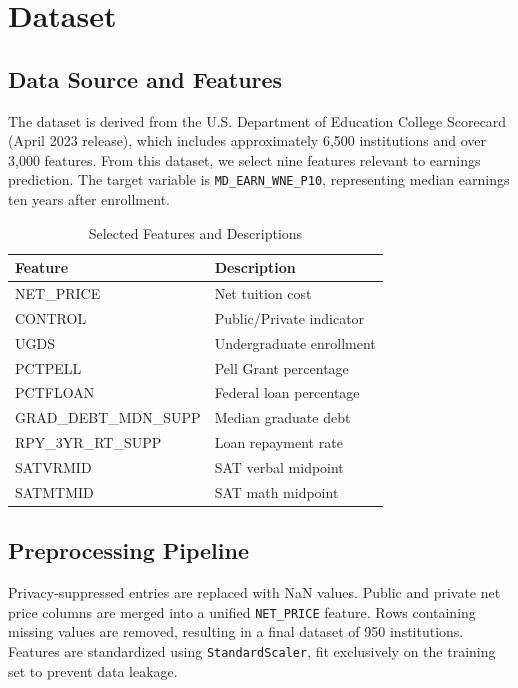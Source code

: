 \documentclass[11pt]{article}
\begin{document}
\section{Dataset}

\subsection{Data Source and Features}

The dataset is derived from the U.S. Department of Education College Scorecard (April 2023 release), which includes approximately 6,500 institutions and over 3,000 features. From this dataset, we select nine features relevant to earnings prediction. The target variable is \texttt{MD\_EARN\_WNE\_P10}, representing median earnings ten years after enrollment.

\begin{table}[h]
\centering
\caption{Selected Features and Descriptions}
\begin{tabular}{ll}
\toprule
Feature & Description \\
\midrule
NET\_PRICE & Net tuition cost \\
CONTROL & Public/Private indicator \\
UGDS & Undergraduate enrollment \\
PCTPELL & Pell Grant percentage \\
PCTFLOAN & Federal loan percentage \\
GRAD\_DEBT\_MDN\_SUPP & Median graduate debt \\
RPY\_3YR\_RT\_SUPP & Loan repayment rate \\
SATVRMID & SAT verbal midpoint \\
SATMTMID & SAT math midpoint \\
\bottomrule
\end{tabular}
\end{table}

\subsection{Preprocessing Pipeline}

Privacy-suppressed entries are replaced with NaN values. Public and private net price columns are merged into a unified \texttt{NET\_PRICE} feature. Rows containing missing values are removed, resulting in a final dataset of 950 institutions. Features are standardized using \texttt{StandardScaler}, fit exclusively on the training set to prevent data leakage.
\end{document}
